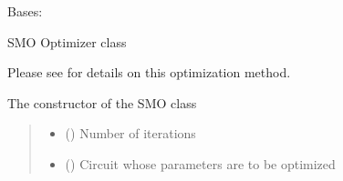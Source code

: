\documentclass[letterpaper,10pt,english]{sphinxmanual}
\begin{document}
\begin{fulllineitems}
\begin{fulllineitems}
\begin{quote}
\begin{description}
\begin{itemize}
\end{itemize}

\end{description}\end{quote}

\end{fulllineitems}


\end{fulllineitems}


\begin{fulllineitems}
\label{\detokenize{qcompute_qapp.optimizer:qcompute_qapp.optimizer.SMO}}
\pysigstartsignatures
{}
\pysigstopsignatures
\sphinxAtStartPar
Bases: {\hyperref[\detokenize{qcompute_qapp.optimizer:qcompute_qapp.optimizer.BasicOptimizer}]{}}

\sphinxAtStartPar
SMO Optimizer class

\sphinxAtStartPar
Please see  for details on this optimization method.

\sphinxAtStartPar
The constructor of the SMO class
\begin{quote}\begin{description}
\begin{itemize}
\item {} 
\sphinxAtStartPar
{} () \textendash{} Number of iterations

\item {} 
\sphinxAtStartPar
{} ({\hyperref[\detokenize{qcompute_qapp.circuit:qcompute_qapp.circuit.BasicCircuit}]{}}) \textendash{} Circuit whose parameters are to be optimized

\end{itemize}


\end{description}
\end{quote}
\end{fulllineitems}
\end{document}
